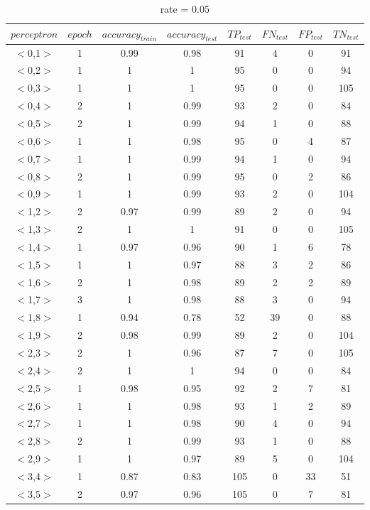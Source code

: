 \documentclass[11pt,letterpaper,oneside]{article}
\begin{document}
\begin{table}[th]
\caption{rate = 0.05}
\centering
\begin{tabular*}{\textwidth}{@{\extracolsep{\fill}}cccccccc}
\hline
$perceptron$ & $epoch$ & $accuracy_{train}$ & $accuracy_{test}$ & $TP_{test}$ & $FN_{test}$ & $FP_{test}$ & $TN_{test}$\\ \hline
$<$0,1$>$ & 1 & 0.99 & 0.98 & 91 & 4 & 0 & 91\\
$<$0,2$>$ & 1 & 1 & 1 & 95 & 0 & 0 & 94\\
$<$0,3$>$ & 1 & 1 & 1 & 95 & 0 & 0 & 105\\
$<$0,4$>$ & 2 & 1 & 0.99 & 93 & 2 & 0 & 84\\
$<$0,5$>$ & 2 & 1 & 0.99 & 94 & 1 & 0 & 88\\
$<$0,6$>$ & 1 & 1 & 0.98 & 95 & 0 & 4 & 87\\
$<$0,7$>$ & 1 & 1 & 0.99 & 94 & 1 & 0 & 94\\
$<$0,8$>$ & 2 & 1 & 0.99 & 95 & 0 & 2 & 86\\
$<$0,9$>$ & 1 & 1 & 0.99 & 93 & 2 & 0 & 104\\
$<$1,2$>$ & 2 & 0.97 & 0.99 & 89 & 2 & 0 & 94\\
$<$1,3$>$ & 2 & 1 & 1 & 91 & 0 & 0 & 105\\
$<$1,4$>$ & 1 & 0.97 & 0.96 & 90 & 1 & 6 & 78\\
$<$1,5$>$ & 1 & 1 & 0.97 & 88 & 3 & 2 & 86\\
$<$1,6$>$ & 2 & 1 & 0.98 & 89 & 2 & 2 & 89\\
$<$1,7$>$ & 3 & 1 & 0.98 & 88 & 3 & 0 & 94\\
$<$1,8$>$ & 1 & 0.94 & 0.78 & 52 & 39 & 0 & 88\\
$<$1,9$>$ & 2 & 0.98 & 0.99 & 89 & 2 & 0 & 104\\
$<$2,3$>$ & 2 & 1 & 0.96 & 87 & 7 & 0 & 105\\
$<$2,4$>$ & 2 & 1 & 1 & 94 & 0 & 0 & 84\\
$<$2,5$>$ & 1 & 0.98 & 0.95 & 92 & 2 & 7 & 81\\
$<$2,6$>$ & 1 & 1 & 0.98 & 93 & 1 & 2 & 89\\
$<$2,7$>$ & 1 & 1 & 0.98 & 90 & 4 & 0 & 94\\
$<$2,8$>$ & 2 & 1 & 0.99 & 93 & 1 & 0 & 88\\
$<$2,9$>$ & 1 & 1 & 0.97 & 89 & 5 & 0 & 104\\
$<$3,4$>$ & 1 & 0.87 & 0.83 & 105 & 0 & 33 & 51\\
$<$3,5$>$ & 2 & 0.97 & 0.96 & 105 & 0 & 7 & 81\\

\end{tabular*}
\end{table}
\end{document}
